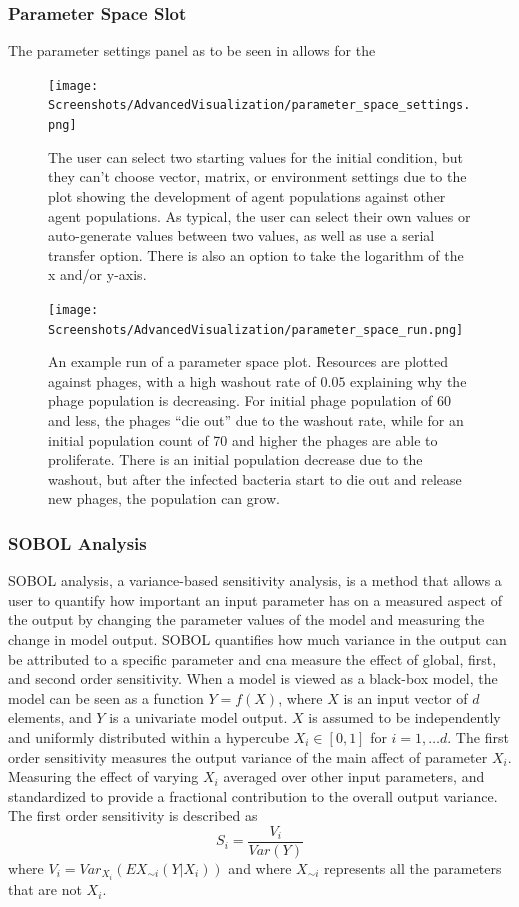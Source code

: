 \subsubsection{Parameter Space Slot}
The parameter settings panel as to be seen in  allows for the 
\begin{figure}
    \centering 
    \texttt{[image: Screenshots/AdvancedVisualization/parameter\_space\_settings.png]}
    \caption{
        The user can select two starting values for the initial condition, but they can't choose vector, matrix, or environment settings due to the plot showing the development of agent populations against other agent populations. 
        As typical, the user can select their own values or auto-generate values between two values, as well as use a serial transfer option. 
        There is also an option to take the logarithm of the x and/or y-axis. 
    }
    \label{fig:ss:av:parameter_space_settings}
\end{figure}
\begin{figure}
    \centering 
    \texttt{[image: Screenshots/AdvancedVisualization/parameter\_space\_run.png]}
    \caption{
        An example run of a parameter space plot. 
        Resources are plotted against phages, with a high washout rate of $0.05$ explaining why the phage population is decreasing. 
        For initial phage population of 60 and less, the phages “die out” due to the washout rate, while for an initial population count of 70 and higher the phages are able to proliferate. 
        There is an initial population decrease due to the washout, but after the infected bacteria start to die out and release new phages, the population can grow. 
    }
    \label{fig:ss:av:parameter_space_run}
\end{figure}

\subsubsection{SOBOL Analysis}
SOBOL analysis, a variance-based sensitivity analysis, is a method that allows a user to quantify how important an input parameter has on a measured aspect of the output by changing the parameter values of the model and measuring the change in model output. 
SOBOL quantifies how much variance in the output can be attributed to a specific parameter and cna measure the effect of global, first, and second order sensitivity.  
When a model is viewed as a black-box model, the model can be seen as a function $Y=f(X)$, where $X$ is an input vector of $d$ elements, and $Y$ is a univariate model output. 
$X$ is assumed to be independently and uniformly distributed within a hypercube $X_i \in [0, 1]$ for $i=1, \dots d$. 
The first order sensitivity measures the output variance of the main affect of parameter $X_i$. 
Measuring the effect of varying $X_i$ averaged over other input parameters, and standardized to provide a fractional contribution to the overall output variance. 
The first order sensitivity is described as 
\[
    S_i = \frac{V_i}{Var(Y)}
\] where $V_i = Var_{X_i}(E{X_{\sim i}}(Y|X_i))$ and where $X_{\sim i}$ represents all the parameters that are not $X_i$. 
\newline

